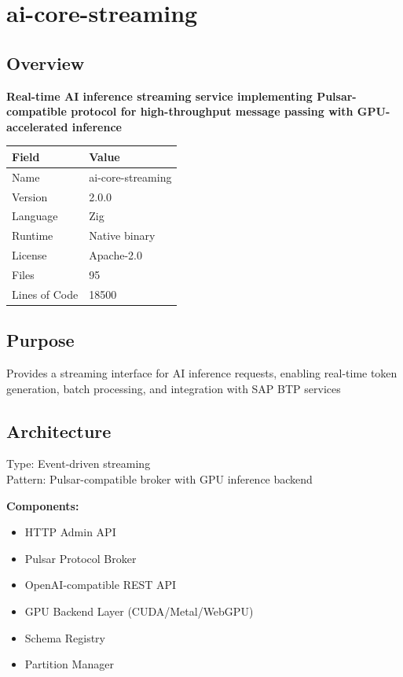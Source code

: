 \documentclass[11pt,a4paper]{article}
\begin{document}
\newpage


\section{ai-core-streaming}

\subsection{Overview}

\textbf{Real-time AI inference streaming service implementing Pulsar-compatible protocol for high-throughput message passing with GPU-accelerated inference}

\begin{tabular}{@{}ll@{}}
\toprule
\textbf{Field} & \textbf{Value} \\
\midrule
Name & ai-core-streaming \\
Version & 2.0.0 \\
Language & Zig \\
Runtime & Native binary \\
License & Apache-2.0 \\
Files & 95 \\
Lines of Code & 18500 \\
\bottomrule
\end{tabular}

\subsection{Purpose}
Provides a streaming interface for AI inference requests, enabling real-time token generation, batch processing, and integration with SAP BTP services

\subsection{Architecture}
Type: Event-driven streaming \\
Pattern: Pulsar-compatible broker with GPU inference backend

\textbf{Components:}\begin{itemize}[noitemsep]
\item HTTP Admin API
\item Pulsar Protocol Broker
\item OpenAI-compatible REST API
\item GPU Backend Layer (CUDA/Metal/WebGPU)
\item Schema Registry
\item Partition Manager
\end{itemize}
\end{document}
